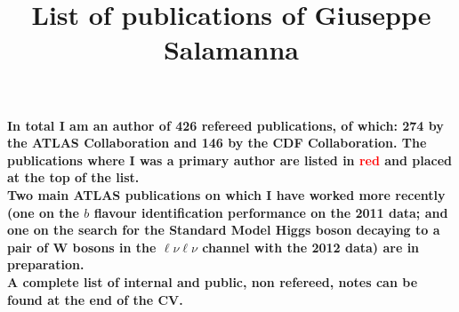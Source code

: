 \documentclass{article}
\begin{document}
\title{List of publications of Giuseppe Salamanna}
\author{}
\date{}
\maketitle

{\bf In total I am an author of 426 refereed publications, of which: 274 by the ATLAS Collaboration and 146 by the CDF Collaboration.
The publications where I was a primary author are listed in \textcolor{red}{red} and placed at the top of the list.  \\

Two main ATLAS publications on which I have worked more recently (one on the $b$ flavour identification performance on the 2011 data; and one on the search for the Standard Model Higgs boson decaying to a pair of W bosons in the $\ell \nu \ell \nu$ channel with the 2012 data) are in preparation. \\

A complete list of internal and public, non refereed, notes can be found at the end of the CV.}
 \newline
\end{document}
